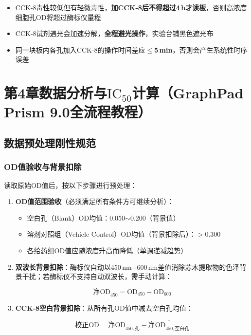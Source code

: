 \documentclass[12pt,a4paper]{article}
\newcommand{\ic}{\ensuremath{\text{IC}_{50}}}
\begin{document}
\begin{warningbox}[title={⚠\ CCK-8检测刚性注意事项}]
\begin{itemize}
\item CCK-8毒性较低但有轻微毒性，\textbf{加CCK-8后不得超过4\,h才读板}，否则高浓度细胞孔OD将超过酶标仪量程
\item CCK-8试剂遇光会加速分解，\textbf{全程避光操作}，实验台铺黑色遮光布
\item 同一块板内各孔加入CCK-8的操作时间差应\textbf{$\leq$5\,min}，否则会产生系统性时序误差
\end{itemize}
\end{warningbox}

\section{第4章\enspace 数据分析与\ic{}计算（GraphPad Prism 9.0全流程教程）}

\subsection{数据预处理刚性规范}

\subsubsection{OD值验收与背景扣除}

读取原始OD值后，按以下步骤进行预处理：

\begin{enumerate}
\item \textbf{OD值范围验收}（必须满足所有条件方可继续分析）：
  \begin{itemize}
  \item 空白孔（Blank）OD均值：0.050$\sim$0.200（背景值）
  \item 溶剂对照组（Vehicle Control）OD均值（背景扣除后）：$>$0.300
  \item 各给药组OD值应随浓度升高而降低（单调递减趋势）
  \end{itemize}
\item \textbf{双波长背景扣除}：酶标仪自动以450\,nm$-$600\,nm差值消除苏木提取物的色泽背景干扰\cite{ref19}；若酶标仪不支持自动双波长，需手动计算：

\[
\text{净OD}_{450} = \text{OD}_{450} - \text{OD}_{600}
\]

\item \textbf{CCK-8空白背景扣除}：从所有孔OD值中减去空白孔均值：

\[
\text{校正OD} = \text{净OD}_{450,\text{孔}} - \overline{\text{净OD}_{450,\text{空白孔}}}
\]
\end{enumerate}
\end{document}

